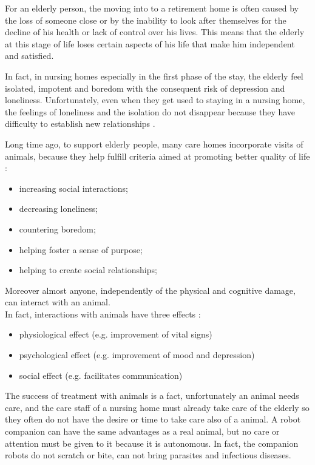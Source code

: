 \documentclass{thesisreport}
\begin{document}
 For an elderly person, the moving into to a retirement home is often caused by the loss of someone close or by the inability to look after themselves for the decline of his health or lack of control over his lives.
 This means that the elderly at this stage of life loses certain aspects of his life that make him independent and satisfied.
 
 In fact, in nursing homes especially in the first phase of the stay, the elderly feel isolated, impotent and boredom with the consequent risk of depression and loneliness.
 Unfortunately, even when they get used to staying in a nursing home, the feelings of loneliness and the isolation do not disappear because they have difficulty to establish new relationships \cite{assistiveRobots}.
 
 Long time ago, to support elderly people, many care homes incorporate visits of animals, because they help fulfill criteria aimed at promoting better quality of life \cite{psicologicalEffects}:
 \begin{itemize}
     \item increasing social interactions;
     \item decreasing loneliness;
     \item countering boredom;
     \item helping foster a sense of purpose;
     \item helping to create social relationships;
 \end{itemize}
 Moreover almost anyone, independently of the physical and cognitive damage, can interact with an animal.  \\
 In fact, interactions with animals have three effects \cite{psicologicalEffects}: 
 \begin{itemize}
     \item physiological effect (e.g. improvement of vital signs)
     \item psychological effect (e.g. improvement of mood and depression)
     \item social effect (e.g. facilitates communication)
 \end{itemize}

 The success of treatment with animals is a fact, unfortunately an animal needs care, and the care staff of a nursing home must already take care of the elderly so they often do not have the desire or time to take care also of a animal.
 A robot companion can have the same advantages as a real animal, but no care or attention must be given to it because it is autonomous.
 In fact, the companion robots do not scratch or bite, can not bring parasites and infectious diseases.
 
\end{document}
